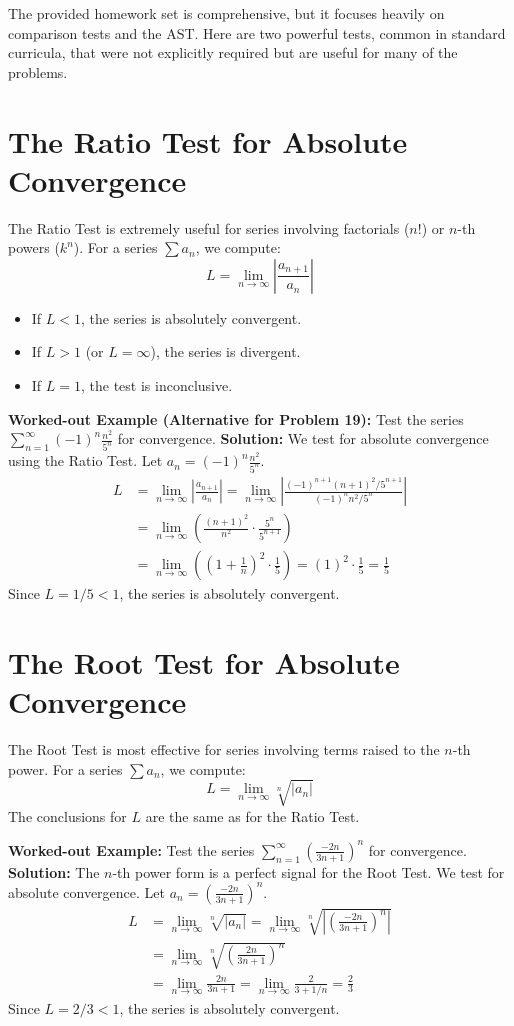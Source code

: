 \documentclass{article}
\begin{document}
The provided homework set is comprehensive, but it focuses heavily on comparison tests and the AST. Here are two powerful tests, common in standard curricula, that were not explicitly required but are useful for many of the problems.

\section{The Ratio Test for Absolute Convergence}
The Ratio Test is extremely useful for series involving factorials ($n!$) or $n$-th powers ($k^n$). For a series $\sum a_n$, we compute:
\[ L = \lim_{n \to \infty} \left| \frac{a_{n+1}}{a_n} \right| \]
\begin{itemize}
    \item If $L < 1$, the series is absolutely convergent.
    \item If $L > 1$ (or $L=\infty$), the series is divergent.
    \item If $L = 1$, the test is inconclusive.
\end{itemize}

\textbf{Worked-out Example (Alternative for Problem 19):} Test the series $\sum_{n=1}^{\infty} (-1)^n \frac{n^2}{5^n}$ for convergence.
\textbf{Solution:} We test for absolute convergence using the Ratio Test.
Let $a_n = (-1)^n \frac{n^2}{5^n}$.
\begin{align*}
    L &= \lim_{n \to \infty} \left| \frac{a_{n+1}}{a_n} \right| = \lim_{n \to \infty} \left| \frac{(-1)^{n+1} (n+1)^2 / 5^{n+1}}{(-1)^n n^2 / 5^n} \right| \\
    &= \lim_{n \to \infty} \left( \frac{(n+1)^2}{n^2} \cdot \frac{5^n}{5^{n+1}} \right) \\
    &= \lim_{n \to \infty} \left( \left( 1 + \frac{1}{n} \right)^2 \cdot \frac{1}{5} \right) = (1)^2 \cdot \frac{1}{5} = \frac{1}{5}
\end{align*}
Since $L = 1/5 < 1$, the series is absolutely convergent.

\section{The Root Test for Absolute Convergence}
The Root Test is most effective for series involving terms raised to the $n$-th power. For a series $\sum a_n$, we compute:
\[ L = \lim_{n \to \infty} \sqrt[n]{|a_n|} \]
The conclusions for $L$ are the same as for the Ratio Test.

\textbf{Worked-out Example:} Test the series $\sum_{n=1}^{\infty} \left( \frac{-2n}{3n+1} \right)^n$ for convergence.
\textbf{Solution:} The $n$-th power form is a perfect signal for the Root Test. We test for absolute convergence.
Let $a_n = \left( \frac{-2n}{3n+1} \right)^n$.
\begin{align*}
    L &= \lim_{n \to \infty} \sqrt[n]{|a_n|} = \lim_{n \to \infty} \sqrt[n]{\left| \left( \frac{-2n}{3n+1} \right)^n \right|} \\
    &= \lim_{n \to \infty} \sqrt[n]{\left( \frac{2n}{3n+1} \right)^n} \\
    &= \lim_{n \to \infty} \frac{2n}{3n+1} = \lim_{n \to \infty} \frac{2}{3 + 1/n} = \frac{2}{3}
\end{align*}
Since $L = 2/3 < 1$, the series is absolutely convergent.
\end{document}
